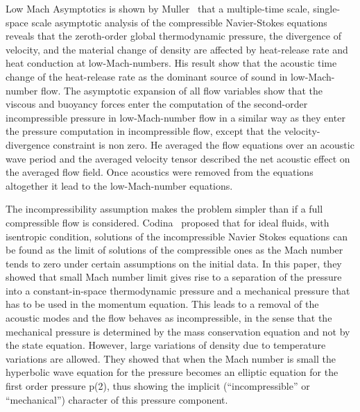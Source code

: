 Low Mach Asymptotics is shown by Muller~\cite{Muller} that a multiple-time scale,
single-space scale asymptotic analysis of the compressible
Navier-Stokes equations reveals that the zeroth-order global
thermodynamic pressure, the divergence of velocity, and the material
change of density are affected by heat-release rate and heat
conduction at low-Mach-numbers. His result show that the acoustic time change of the
heat-release rate as the dominant source of sound in low-Mach-number
flow. The asymptotic expansion of all flow variables show that the
viscous and buoyancy forces enter the computation of the second-order
incompressible pressure in low-Mach-number flow in a similar way as
they enter the pressure computation in incompressible flow, except
that the velocity-divergence constraint is non zero. He averaged the flow
equations over an acoustic wave period and the averaged velocity tensor
described the net acoustic effect on the averaged flow field. Once
acoustics were removed from the equations altogether it lead to the
low-Mach-number equations.

\bigskip
 The incompressibility assumption makes the problem simpler
than if a full compressible flow is considered. Codina~\cite{Codina}
proposed that for ideal fluids, with isentropic condition, solutions
of the incompressible Navier Stokes equations can be found as the
limit of solutions of the compressible ones as the Mach number tends
to zero under certain assumptions on the initial data. In this paper, 
they showed that small Mach number limit
gives rise to a separation of the pressure into a constant-in-space
thermodynamic pressure and a mechanical pressure that has to be used
in the momentum equation. This leads to a removal of the acoustic
modes and the flow behaves as incompressible, in the sense that the
mechanical pressure is determined by the mass conservation equation
and not by the state equation. However, large variations of density
due to temperature variations are allowed. They showed that when the
Mach number is small the hyperbolic wave equation for the pressure
becomes an elliptic equation for the first order pressure p(2), thus
showing the implicit (“incompressible” or “mechanical”) character of
this pressure component.


